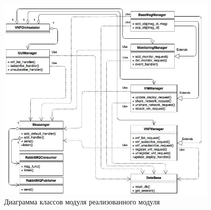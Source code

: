 \documentclass[oneside,final,14pt,a4paper]{extreport}
\begin{document}
\begin{figure}[h]
	\centering
	\includegraphics[width=0.95\textwidth]{classes_diagram}
	\caption{Диаграмма классов модуля реализованного модуля}
	\label{pic:classes_diagram}
\end{figure}
\end{document}
